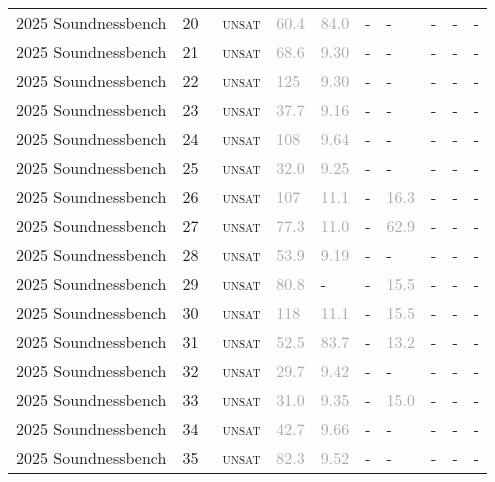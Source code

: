 \begin{center}
{\begin{longtable}{@{}llllllllll@{}}
2025 Soundnessbench & 20 & ~\textsc{unsat} & \textcolor{darkgray}{60.4} & \textcolor{darkgray}{84.0} & - & - & - & - & - \\
2025 Soundnessbench & 21 & ~\textsc{unsat} & \textcolor{darkgray}{68.6} & \textcolor{darkgray}{9.30} & - & - & - & - & - \\
2025 Soundnessbench & 22 & ~\textsc{unsat} & \textcolor{darkgray}{125} & \textcolor{darkgray}{9.30} & - & - & - & - & - \\
2025 Soundnessbench & 23 & ~\textsc{unsat} & \textcolor{darkgray}{37.7} & \textcolor{darkgray}{9.16} & - & - & - & - & - \\
2025 Soundnessbench & 24 & ~\textsc{unsat} & \textcolor{darkgray}{108} & \textcolor{darkgray}{9.64} & - & - & - & - & - \\
2025 Soundnessbench & 25 & ~\textsc{unsat} & \textcolor{darkgray}{32.0} & \textcolor{darkgray}{9.25} & - & - & - & - & - \\
2025 Soundnessbench & 26 & ~\textsc{unsat} & \textcolor{darkgray}{107} & \textcolor{darkgray}{11.1} & - & \textcolor{darkgray}{16.3} & - & - & - \\
2025 Soundnessbench & 27 & ~\textsc{unsat} & \textcolor{darkgray}{77.3} & \textcolor{darkgray}{11.0} & - & \textcolor{darkgray}{62.9} & - & - & - \\
2025 Soundnessbench & 28 & ~\textsc{unsat} & \textcolor{darkgray}{53.9} & \textcolor{darkgray}{9.19} & - & - & - & - & - \\
2025 Soundnessbench & 29 & ~\textsc{unsat} & \textcolor{darkgray}{80.8} & - & - & \textcolor{darkgray}{15.5} & - & - & - \\
2025 Soundnessbench & 30 & ~\textsc{unsat} & \textcolor{darkgray}{118} & \textcolor{darkgray}{11.1} & - & \textcolor{darkgray}{15.5} & - & - & - \\
2025 Soundnessbench & 31 & ~\textsc{unsat} & \textcolor{darkgray}{52.5} & \textcolor{darkgray}{83.7} & - & \textcolor{darkgray}{13.2} & - & - & - \\
2025 Soundnessbench & 32 & ~\textsc{unsat} & \textcolor{darkgray}{29.7} & \textcolor{darkgray}{9.42} & - & - & - & - & - \\
2025 Soundnessbench & 33 & ~\textsc{unsat} & \textcolor{darkgray}{31.0} & \textcolor{darkgray}{9.35} & - & \textcolor{darkgray}{15.0} & - & - & - \\
2025 Soundnessbench & 34 & ~\textsc{unsat} & \textcolor{darkgray}{42.7} & \textcolor{darkgray}{9.66} & - & - & - & - & - \\
2025 Soundnessbench & 35 & ~\textsc{unsat} & \textcolor{darkgray}{82.3} & \textcolor{darkgray}{9.52} & - & - & - & - & - \\

\end{longtable}}
\end{center}
